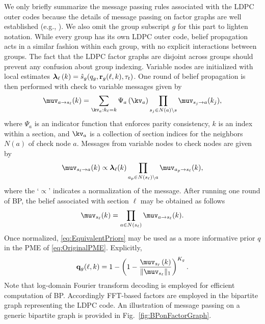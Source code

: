 \documentclass[journal]{IEEEtran}
\begin{document}
We only briefly summarize the message passing rules associated with the LDPC outer codes because the details of message passing on factor graphs are well established (e.g., \cite{kschischang2001factorgraph}).
We also omit the group subscript $g$ for this part to lighten notation.
While every group has its own LDPC outer code, belief propagation acts in a similar fashion within each group, with no explicit interactions between groups.
The fact that the LDPC factor graphs are disjoint across groups should prevent any confusion about group indexing.
Variable nodes are initialized with local estimates $\boldsymbol{\lambda}_{\ell}\left(k\right) = \hat{s}_{g}(q_g, \mathbf{r}_g(\ell, k), \tau_t)$.
One round of belief propagation is then performed with check to variable messages given by
\begin{equation} \label{eq:BP-Check2Variable}
    \muv_{a \to s_{\ell}} (k)
    = \sum_{\kv_{a}: k_{\ell} = k} \Psi_{a} \left( \kv_{a} \right)
    \prod_{s_j \in N(a) \setminus s} \muv_{s_j \to a} (k_j),
\end{equation}
where $\Psi_{a}$ is an indicator function that enforces parity consistency, $k$ is an index within a section, and $\kv_{a}$ is a collection of section indices for the neighbors $N(a)$ of check node $a$.
Messages from variable nodes to check nodes are given by
\begin{equation} \label{eq:BP-Variable2Check}
    \muv_{s_{\ell} \rightarrow a} (k)
    \propto \lambdav_{\ell} (k) \prod_{a_p \in N(s_{\ell}) \setminus a} \muv_{a_p \to s_{\ell}} (k),
\end{equation}
where the `$\propto$' indicates a normalization of the message.
After running one round of BP, the belief associated with section $\ell$ may be obtained as follows
\begin{equation} \label{eq:EquivalentPriors}
    \muv_{s_{\ell}}(k) = \prod_{a \in N(s_{\ell})} \muv_{a \to s_{\ell}} (k) .
\end{equation}
Once normalized, \eqref{eq:EquivalentPriors} may be used as a more informative prior $q$ in the PME of \eqref{eq:OriginalPME}.
Explicitly,
\begin{equation} \label{equation:BP-priors}
    \qv_g(\ell, k) = 1 - \left(1 - \frac{\muv_{s_\ell}\left(k\right)}{\| \muv_{s_\ell} \|_1}\right)^{K_g} .
\end{equation}
Note that log-domain Fourier transform decoding \cite{davey1998low,song2003reduced} is employed for efficient computation of BP. 
Accordingly FFT-based factors are employed in the bipartite graph representing the LDPC code.
\noindent
An illustration of message passing on a generic bipartite graph is provided in Fig.~\ref{fig:BPonFactorGraph}. 
\end{document}
